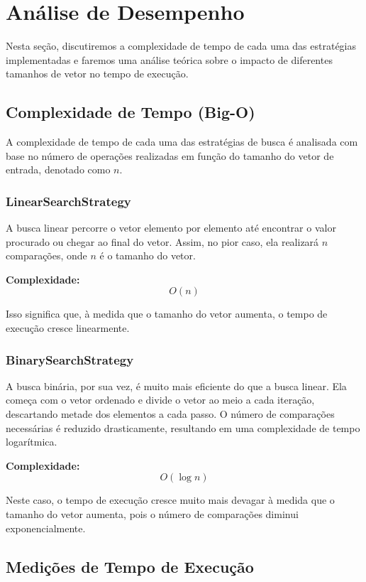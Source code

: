 \section{Análise de Desempenho}

Nesta seção, discutiremos a complexidade de tempo de cada uma das estratégias implementadas 
e faremos uma análise teórica sobre o impacto de diferentes tamanhos de vetor no tempo de execução.

\subsection{Complexidade de Tempo (Big-O)}

A complexidade de tempo de cada uma das estratégias de busca é analisada com base no número de 
operações realizadas em função do tamanho do vetor de entrada, denotado como \( n \).

\subsubsection{LinearSearchStrategy}

A busca linear percorre o vetor elemento por elemento até encontrar o valor procurado ou chegar 
ao final do vetor. Assim, no pior caso, ela realizará \( n \) comparações, onde \( n \) é o tamanho do vetor.

\textbf{Complexidade:} 
\[
O(n)
\]

Isso significa que, à medida que o tamanho do vetor aumenta, o tempo de execução cresce linearmente.

\subsubsection{BinarySearchStrategy}

A busca binária, por sua vez, é muito mais eficiente do que a busca linear. Ela começa com o vetor 
ordenado e divide o vetor ao meio a cada iteração, descartando metade dos elementos a cada passo. 
O número de comparações necessárias é reduzido drasticamente, resultando em uma complexidade de tempo logarítmica.

\textbf{Complexidade:}
\[
O(\log n)
\]

Neste caso, o tempo de execução cresce muito mais devagar à medida que o tamanho do vetor aumenta, 
pois o número de comparações diminui exponencialmente.

\subsection{Medições de Tempo de Execução}

